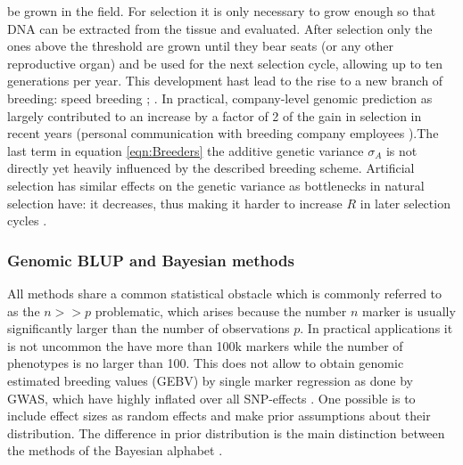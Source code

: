 be grown in the field. For selection it is only necessary to grow enough so that DNA can be extracted from the
tissue and evaluated. After selection only the ones above the threshold are grown until they bear seats (or
any other reproductive organ) and be used for the next selection cycle, allowing up to ten generations per
year. This development hast lead to the rise to a new branch of breeding: speed breeding
\cite{ghosh2018speed}; \cite{watson2018speed}. In practical, company-level genomic prediction as largely
contributed to an increase by a factor of 2 of the gain in selection in recent years (personal
communication with breeding company employees ).\newline The last term in equation \ref{eqn:Breeders} the additive genetic variance $\sigma_A$
is not directly yet heavily influenced by the described breeding scheme. Artificial selection has similar
effects on the genetic variance as bottlenecks in natural selection have: it decreases, thus making it harder
to increase $R$ in later selection cycles \cite{walsh2018}.


\subsubsection{Genomic BLUP and Bayesian methods}\label{blup:bayes}

All methods share a common statistical obstacle which is commonly referred to as the $n >> p$ problematic,
which arises because the number $n$ marker is usually significantly larger than the number of observations
$p$. In practical applications it is not uncommon the have more than 100k markers while the number of
phenotypes is no larger than 100. This does not allow to obtain genomic estimated breeding values (GEBV) by
single marker regression as done by GWAS, which have highly inflated over all SNP-effects
\cite{korte2013advantages}. One possible is to include effect sizes as random effects and make prior
assumptions about their distribution. The difference in prior distribution is the main distinction between the
methods of the Bayesian alphabet
\cite{gianola2013}.\\

